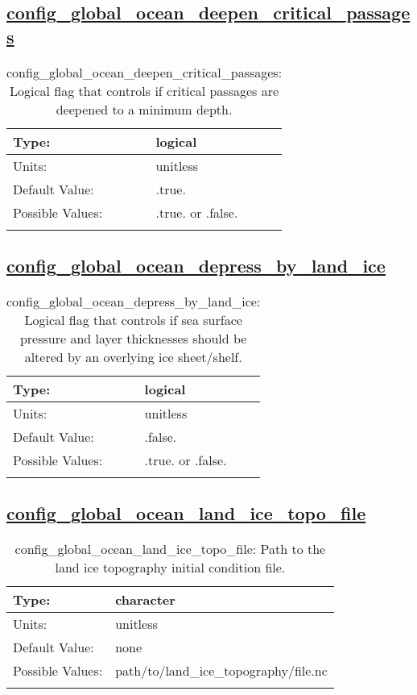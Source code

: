\subsection[config\_global\_ocean\_deepen\_critical\_passages]{\hyperref[sec:nm_tab_global_ocean]{config\_global\_ocean\_deepen\_critical\_passages}}
\label{subsec:nm_sec_config_global_ocean_deepen_critical_passages}
\begin{center}
\begin{longtable}{| p{2.0in} || p{4.0in} |}
    \hline
    Type: & logical \\
    \hline
    Units: & \si{unitless} \\
    \hline
    Default Value: & .true. \\
    \hline
    Possible Values: & .true. or .false. \\
    \hline
    \caption{config\_global\_ocean\_deepen\_critical\_passages: Logical flag that controls if critical passages are deepened to a minimum depth.}
\end{longtable}
\end{center}
\subsection[config\_global\_ocean\_depress\_by\_land\_ice]{\hyperref[sec:nm_tab_global_ocean]{config\_global\_ocean\_depress\_by\_land\_ice}}
\label{subsec:nm_sec_config_global_ocean_depress_by_land_ice}
\begin{center}
\begin{longtable}{| p{2.0in} || p{4.0in} |}
    \hline
    Type: & logical \\
    \hline
    Units: & \si{unitless} \\
    \hline
    Default Value: & .false. \\
    \hline
    Possible Values: & .true. or .false. \\
    \hline
    \caption{config\_global\_ocean\_depress\_by\_land\_ice: Logical flag that controls if sea surface pressure and layer thicknesses should be altered by an overlying ice sheet/shelf.}
\end{longtable}
\end{center}
\subsection[config\_global\_ocean\_land\_ice\_topo\_file]{\hyperref[sec:nm_tab_global_ocean]{config\_global\_ocean\_land\_ice\_topo\_file}}
\label{subsec:nm_sec_config_global_ocean_land_ice_topo_file}
\begin{center}
\begin{longtable}{| p{2.0in} || p{4.0in} |}
    \hline
    Type: & character \\
    \hline
    Units: & \si{unitless} \\
    \hline
    Default Value: & none \\
    \hline
    Possible Values: & path/to/land\_ice\_topography/file.nc \\
    \hline
    \caption{config\_global\_ocean\_land\_ice\_topo\_file: Path to the land ice topography initial condition file.}
\end{longtable}
\end{center}
